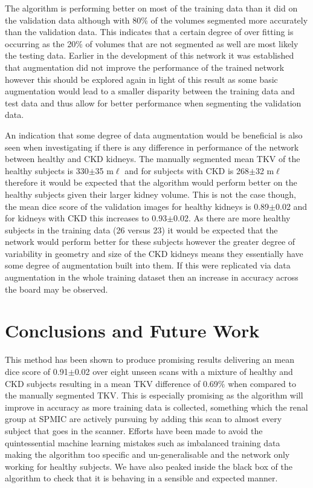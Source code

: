 The algorithm is performing better on most of the training data than it did on the validation data although with 80\% of the volumes segmented more accurately than the validation data. This indicates that a certain degree of over fitting is occurring as the 20\% of volumes that are not segmented as well are most likely the testing data. Earlier in the development of this network it was established that augmentation did not improve the performance of the trained network however this should be explored again in light of this result as some basic augmentation would lead to a smaller disparity between the training data and test data and thus allow for better performance when segmenting the validation data.

An indication that some degree of data augmentation would be beneficial is also seen when investigating if there is any difference in performance of the network between healthy and \ac{CKD} kidneys. The manually segmented mean \ac{TKV} of the healthy subjects is 330$\pm$35 m$\ell$ and for subjects with \ac{CKD} is 268$\pm$32 m$\ell$ therefore it would be expected that the algorithm would perform better on the healthy subjects given their larger kidney volume. This is not the case though, the mean dice score of the validation images for healthy kidneys is 0.89$\pm$0.02 and for kidneys with \ac{CKD} this increases to 0.93$\pm$0.02. As there are more healthy subjects in the training data (26 versus 23) it would be expected that the network would perform better for these subjects however the greater degree of variability in geometry and size of the \ac{CKD} kidneys means they essentially have some degree of augmentation built into them. If this were replicated via data augmentation in the whole training dataset then an increase in accuracy across the board may be observed.

\newpage
\section{Conclusions and Future Work}

This method has been shown to produce promising results delivering an mean dice score of 0.91$\pm$0.02 over eight unseen scans with a mixture of healthy and \ac{CKD} subjects resulting in a mean \ac{TKV} difference of 0.69\% when compared to the manually segmented \ac{TKV}. This is especially promising as the algorithm will improve in accuracy as more training data is collected, something which the renal group at \ac{SPMIC} are actively pursuing by adding this scan to almost every subject that goes in the scanner. Efforts have been made to avoid the quintessential machine learning mistakes such as imbalanced training data making the algorithm too specific and un-generalisable and the network only working for healthy subjects. We have also peaked inside the black box of the algorithm to check that it is behaving in a sensible and expected manner.

